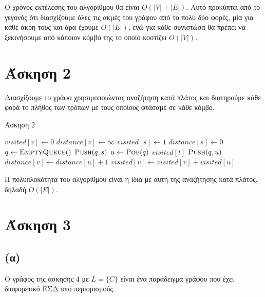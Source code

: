 \documentclass[11pt,a4paper,oneside]{report}
\begin{document}
Ο χρόνος εκτέλεσης του αλγορίθμου θα είναι $O( |V| + |E| )$. Αυτό προκύπτει από το γεγονός ότι διασχίζουμε όλες τις ακμές του γράφου από το πολύ δύο φορές, μία για κάθε άκρη τους και άρα έχουμε $O( |E| )$, ενώ για κάθε συνιστώσα θα πρέπει να ξεκινήσουμε από κάποιον κόμβο της το οποίο κοστίζει $O( |V| )$.

\section*{Άσκηση 2}
Διασχίζουμε το γράφο χρησιμοποιώντας αναζήτηση κατά πλάτος και διατηρούμε κάθε φορά το πλήθος των τρόπων με τους οποίους φτάσαμε σε κάθε κόμβο.

\begin{algorithm}[H]	
\caption{\textgreek{Άσκηση 2}}
\begin{algorithmic}[1]

        \State $visited[ v ] \gets 0$
        \State $distance[ v ] \gets \infty$
    \EndFor
    \State $visited[ s ] \gets 1$
    \State $distance[ s ] \gets 0$
    \State $q \gets \Call{EmptyQueue}$
    \State $\Call{Push}{q, s}$
        \State $u \gets \Call{Pop}{q}$
            \State \Return $visited[ t ]$
        \EndIf
                \State $\Call{Push}{q, u}$
            \EndIf
                \State $distance[ v ] \gets distance[ u ] + 1$
                \State $visited[ v ] \gets visited[ v ] + visited[ u ]$
            \EndIf
        \EndFor
    \EndWhile
\EndProcedure
\end{algorithmic}
\end{algorithm}

Η πολυπλοκότητα του αλγορίθμου είναι η ίδια με αυτή της αναζήτησης κατά πλάτος, δηλαδή $O( |E| )$.

\section*{Άσκηση 3}
\subsection*{(α)}
Ο γράφος της άσκησης 4 με $L = \{ C \}$ είναι ένα παράδειγμα γράφου που έχει διαφορετικό ΕΣΔ υπό περιορισμούς.
\end{document}
